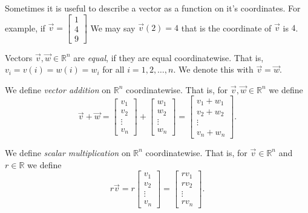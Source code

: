 \begin{remark}
Sometimes it is useful to describe a vector as a function on it's coordinates. 
For example, if 
$\vec{v}=\begin{bmatrix}1 \\ 4 \\ 9 \end{bmatrix}$ We may say 
$\vec{v}(2)=4$ that is the  coordinate of $\vec{v}$ is $4$.
\end{remark}


\begin{definition}
Vectors $\vec{v}, \vec{w} \in \mathbb{R}^n$ are \emph{equal},  if they are 
equal coordinatewise. That is, $v_i=v(i)=w(i)=w_i$ for all $i=1,2,\ldots, n$. 
We denote this with  $\vec{v}=\vec{w}$.
\end{definition}


\begin{definition}
We define \emph{vector addition} on $\mathbb{R}^n$ coordinatewise. 
That is, for $\vec{v},\vec{w} \in \mathbb{R}^n$ we define
\[
\vec{v}+\vec{w}=
\begin{bmatrix}v_1\\ v_2 \\ \vdots \\ v_n\end{bmatrix}+
\begin{bmatrix}w_1\\ w_2 \\ \vdots \\ w_n\end{bmatrix}=
\begin{bmatrix}v_1+w_1\\ v_2+w_2 \\ \vdots \\ v_n+w_n\end{bmatrix}.
\]
\end{definition}

\begin{definition}
We define \emph{scalar multiplication} on $\mathbb{R}^n$ coordinatewise. That 
is, for $\vec{v} \in \mathbb{R}^n$ and $r \in \mathbb{R}$ we define
\[
r\vec{v}=
r\begin{bmatrix}v_1\\ v_2 \\ \vdots \\ v_n\end{bmatrix}=
\begin{bmatrix}rv_1\\ rv_2 \\ \vdots \\ rv_n\end{bmatrix}.
\]
\end{definition}

